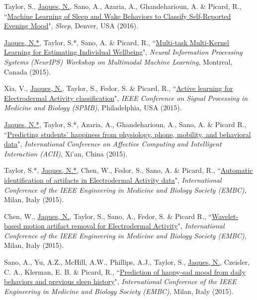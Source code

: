 \documentclass[paper=letter,fontsize=11pt]{scrartcl} %
\newcommand{\PaperEntry}[6]{
		\noindent #1, ``\href{#6}{#2}", \textit{#3}, #4 (#5).}
\begin{document}
\begin{etaremune}
\item \PaperEntry{Taylor, S., \underline{Jaques, N.}, Sano, A., Azaria, A., Ghandeharioun, A. \& Picard, R.}{Machine Learning of Sleep and Wake Behaviors to Classify Self-Reported Evening Mood}{Sleep}{Denver, USA}{2016}{https://affect.media.mit.edu/pdfs/16.Taylor-ClassifyingSelfReportedMood-SLEEP2016.pdf}

\item \PaperEntry{\underline{Jaques, N.*}, Taylor, S.*, Sano, A. \& Picard, R.}{Multi-task Multi-Kernel Learning for Estimating Individual Wellbeing}{Neural Information Processing Systems (NeurIPS) Workshop on Multimodal Machine Learning}{Montreal, Canada}{2015}{https://affect.media.mit.edu/pdfs/15.Jaques-etal-NIPSMMML.pdf}

\item \PaperEntry{Xia, V., \underline{Jaques, N.}, Taylor, S., Fedor, S. \& Picard, R.}{Active learning for Electrodermal Activity classification}{IEEE Conference on Signal Processing in Medicine and Biology (SPMB)}{Philadelphia, USA}{2015}{https://dspace.mit.edu/openaccess-disseminate/1721.1/109392}

\item \PaperEntry{\underline{Jaques, N.*}, Taylor, S.*, Azaria, A., Ghandeharioun, A., Sano, A. \& Picard R.}{Predicting students' happiness from physiology, phone, mobility, and behavioral data}{International Conference on Affective Computing and Intelligent Interaction (ACII)}{Xi'an, China}{2015}{https://www.ncbi.nlm.nih.gov/pmc/articles/PMC5431070/}

\item \PaperEntry{Taylor, S.*, \underline{Jaques, N.*}, Chen, W., Fedor, S., Sano, A. \& Picard, R.}{Automatic identification of artifacts in Electrodermal Activity data}{International Conference of the IEEE Engineering in Medicine and Biology Society (EMBC)}{Milan, Italy}{2015}{https://www.ncbi.nlm.nih.gov/pmc/articles/PMC5413200/}

\item \PaperEntry{Chen, W., \underline{Jaques, N.}, Taylor, S., Sano, A., Fedor, S. \& Picard R.}{Wavelet-based motion artifact removal for Electrodermal Activity}{International Conference of the IEEE Engineering in Medicine and Biology Society (EMBC)}{Milan, Italy}{2015}{https://www.ncbi.nlm.nih.gov/pmc/articles/PMC5413204/}

\item \PaperEntry{Sano, A., Yu, A.Z., McHill, A.W., Phillips, A.J., Taylor, S., \underline{Jaques, N.}, Czeisler, C. A., Klerman, E. B. \& Picard, R.}{Prediction of happy-sad mood from daily behaviors and previous sleep history}{International Conference of the IEEE Engineering in Medicine and Biology Society (EMBC)}{Milan, Italy}{2015}{https://www.ncbi.nlm.nih.gov/pmc/articles/PMC4768795/}


\end{etaremune}
\end{document}
